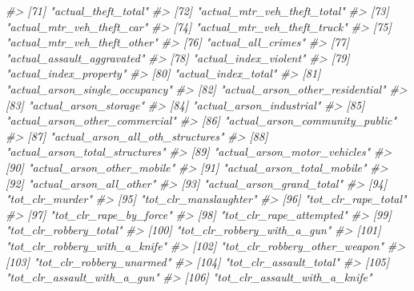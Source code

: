 \documentclass[
]{krantz}
\makeatletter
\newenvironment{Shaded}{\begin{snugshade}}{\end{snugshade}}
\newcommand{\CommentTok}[1]{\textcolor[rgb]{0.37,0.37,0.37}{\textit{#1}}}
\newenvironment{kframe}{%
\medskip{}
\setlength{\fboxsep}{.8em}
 \def\at@end@of@kframe{}%
 \ifinner\ifhmode%
  \def\at@end@of@kframe{\end{minipage}}%
  \begin{minipage}{\columnwidth}%
 \fi\fi%
 \def\FrameCommand##1{\hskip\@totalleftmargin \hskip-\fboxsep
 \colorbox{shadecolor}{##1}\hskip-\fboxsep
     \hskip-\linewidth \hskip-\@totalleftmargin \hskip\columnwidth}%
 \MakeFramed {\advance\hsize-\width
   \@totalleftmargin\z@ \linewidth\hsize
   \@setminipage}}%
 {\par\unskip\endMakeFramed%
 \at@end@of@kframe}
\renewenvironment{Shaded}{\begin{kframe}}{\end{kframe}}
\makeatother
\begin{document}
\begin{Shaded}
\begin{Highlighting}[]
\CommentTok{\#\textgreater{}  [71] "actual\_theft\_total"              }
\CommentTok{\#\textgreater{}  [72] "actual\_mtr\_veh\_theft\_total"      }
\CommentTok{\#\textgreater{}  [73] "actual\_mtr\_veh\_theft\_car"        }
\CommentTok{\#\textgreater{}  [74] "actual\_mtr\_veh\_theft\_truck"      }
\CommentTok{\#\textgreater{}  [75] "actual\_mtr\_veh\_theft\_other"      }
\CommentTok{\#\textgreater{}  [76] "actual\_all\_crimes"               }
\CommentTok{\#\textgreater{}  [77] "actual\_assault\_aggravated"       }
\CommentTok{\#\textgreater{}  [78] "actual\_index\_violent"            }
\CommentTok{\#\textgreater{}  [79] "actual\_index\_property"           }
\CommentTok{\#\textgreater{}  [80] "actual\_index\_total"              }
\CommentTok{\#\textgreater{}  [81] "actual\_arson\_single\_occupancy"   }
\CommentTok{\#\textgreater{}  [82] "actual\_arson\_other\_residential"  }
\CommentTok{\#\textgreater{}  [83] "actual\_arson\_storage"            }
\CommentTok{\#\textgreater{}  [84] "actual\_arson\_industrial"         }
\CommentTok{\#\textgreater{}  [85] "actual\_arson\_other\_commercial"   }
\CommentTok{\#\textgreater{}  [86] "actual\_arson\_community\_public"   }
\CommentTok{\#\textgreater{}  [87] "actual\_arson\_all\_oth\_structures" }
\CommentTok{\#\textgreater{}  [88] "actual\_arson\_total\_structures"   }
\CommentTok{\#\textgreater{}  [89] "actual\_arson\_motor\_vehicles"     }
\CommentTok{\#\textgreater{}  [90] "actual\_arson\_other\_mobile"       }
\CommentTok{\#\textgreater{}  [91] "actual\_arson\_total\_mobile"       }
\CommentTok{\#\textgreater{}  [92] "actual\_arson\_all\_other"          }
\CommentTok{\#\textgreater{}  [93] "actual\_arson\_grand\_total"        }
\CommentTok{\#\textgreater{}  [94] "tot\_clr\_murder"                  }
\CommentTok{\#\textgreater{}  [95] "tot\_clr\_manslaughter"            }
\CommentTok{\#\textgreater{}  [96] "tot\_clr\_rape\_total"              }
\CommentTok{\#\textgreater{}  [97] "tot\_clr\_rape\_by\_force"           }
\CommentTok{\#\textgreater{}  [98] "tot\_clr\_rape\_attempted"          }
\CommentTok{\#\textgreater{}  [99] "tot\_clr\_robbery\_total"           }
\CommentTok{\#\textgreater{} [100] "tot\_clr\_robbery\_with\_a\_gun"      }
\CommentTok{\#\textgreater{} [101] "tot\_clr\_robbery\_with\_a\_knife"    }
\CommentTok{\#\textgreater{} [102] "tot\_clr\_robbery\_other\_weapon"    }
\CommentTok{\#\textgreater{} [103] "tot\_clr\_robbery\_unarmed"         }
\CommentTok{\#\textgreater{} [104] "tot\_clr\_assault\_total"           }
\CommentTok{\#\textgreater{} [105] "tot\_clr\_assault\_with\_a\_gun"      }
\CommentTok{\#\textgreater{} [106] "tot\_clr\_assault\_with\_a\_knife"    }

\end{Highlighting}
\end{Shaded}
\end{document}
